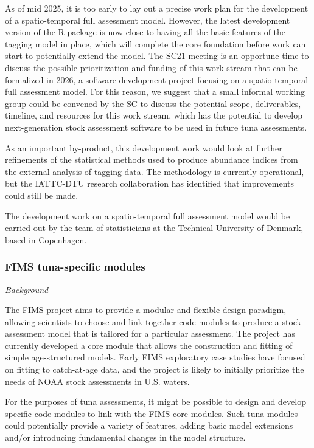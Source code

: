 \documentclass{SCreport}
\begin{document}
As of mid 2025, it is too early to lay out a precise work plan for the
development of a spatio-temporal full assessment model. However, the latest
development version of the R package is now close to having all the basic
features of the tagging model in place, which will complete the core foundation
before work can start to potentially extend the model. The SC21 meeting is an
opportune time to discuss the possible prioritization and funding of this work
stream that can be formalized in 2026, a software development project focusing
on a spatio-temporal full assessment model. For this reason, we suggest that a
small informal working group could be convened by the SC to discuss the
potential scope, deliverables, timeline, and resources for this work stream,
which has the potential to develop next-generation stock assessment software to
be used in future tuna assessments.

As an important by-product, this development work would look at further
refinements of the statistical methods used to produce abundance indices from
the external analysis of tagging data. The methodology is currently operational,
but the IATTC-DTU research collaboration has identified that improvements could
still be made.

The development work on a spatio-temporal full assessment model would be carried
out by the team of statisticians at the Technical University of Denmark, based
in Copenhagen.

\vspace{1ex}

\subsubsection{FIMS tuna-specific modules}
\label{sec:fims-development-project}

\textit{Background}

The FIMS project aims to provide a modular and flexible design paradigm,
allowing scientists to choose and link together code modules to produce a stock
assessment model that is tailored for a particular assessment. The project has
currently developed a core module that allows the construction and fitting of
simple age-structured models. Early FIMS exploratory case studies have focused
on fitting to catch-at-age data, and the project is likely to initially
prioritize the needs of NOAA stock assessments in U.S. waters.

For the purposes of tuna assessments, it might be possible to design and develop
specific code modules to link with the FIMS core modules. Such tuna modules
could potentially provide a variety of features, adding basic model extensions
and/or introducing fundamental changes in the model structure.
\end{document}
